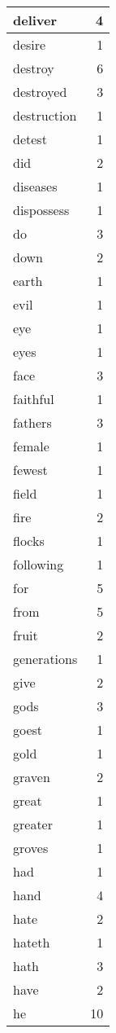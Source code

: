 \begin{center}
\begin{longtable}{l|r}
deliver & 4 \\ \hline
desire & 1 \\ \hline
destroy & 6 \\ \hline
destroyed & 3 \\ \hline
destruction & 1 \\ \hline
detest & 1 \\ \hline
did & 2 \\ \hline
diseases & 1 \\ \hline
dispossess & 1 \\ \hline
do & 3 \\ \hline
down & 2 \\ \hline
earth & 1 \\ \hline
evil & 1 \\ \hline
eye & 1 \\ \hline
eyes & 1 \\ \hline
face & 3 \\ \hline
faithful & 1 \\ \hline
fathers & 3 \\ \hline
female & 1 \\ \hline
fewest & 1 \\ \hline
field & 1 \\ \hline
fire & 2 \\ \hline
flocks & 1 \\ \hline
following & 1 \\ \hline
for & 5 \\ \hline
from & 5 \\ \hline
fruit & 2 \\ \hline
generations & 1 \\ \hline
give & 2 \\ \hline
gods & 3 \\ \hline
goest & 1 \\ \hline
gold & 1 \\ \hline
graven & 2 \\ \hline
great & 1 \\ \hline
greater & 1 \\ \hline
groves & 1 \\ \hline
had & 1 \\ \hline
hand & 4 \\ \hline
hate & 2 \\ \hline
hateth & 1 \\ \hline
hath & 3 \\ \hline
have & 2 \\ \hline
he & 10 \\ \hline

\end{longtable}
\end{center}
